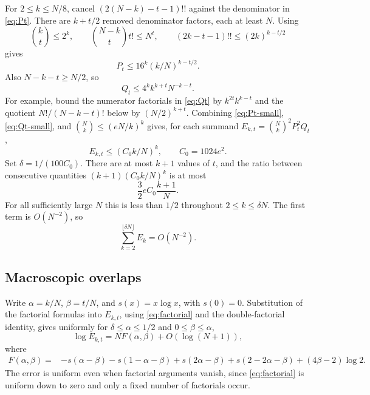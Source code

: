 \documentclass[11pt]{article}
\theoremstyle{remark}
\newcommand{\1}{\mathbf 1}
\begin{document}
For $2\leq k\leq N/8$, cancel
$(2(N-k)-t-1)!!$ against the denominator in \eqref{eq:Pt}.
There are $k+t/2$ removed denominator factors, each at least $N$.
Using
\[
 \binom kt\leq2^k,\qquad
 \binom{N-k}t t!\leq N^t,\qquad
 (2k-t-1)!!\leq(2k)^{k-t/2}
\]
gives
\begin{equation}\label{eq:Pt-small}
 P_t\leq16^k(k/N)^{k-t/2}.
\end{equation}
Also $N-k-t\geq N/2$, so
\begin{equation}\label{eq:Qt-small}
 Q_t\leq4^k k^{k+t}N^{-k-t}.
\end{equation}
For example, bound the numerator factorials in \eqref{eq:Qt} by
$k^{2t}k^{k-t}$ and the quotient $N!/(N-k-t)!$ below by
$(N/2)^{k+t}$. Combining \eqref{eq:Pt-small},
\eqref{eq:Qt-small}, and $\binom Nk\leq(eN/k)^k$ gives, for each
summand $E_{k,t}=\binom Nk^2P_t^2Q_t$,
\[
 E_{k,t}\leq(C_0k/N)^k,\qquad C_0=1024e^2.
\]
Set $\delta=1/(100C_0)$. There are at most $k+1$ values of $t$, and
the ratio between consecutive quantities
$(k+1)(C_0k/N)^k$ is at most
\[
 \frac32 e C_0\frac{k+1}{N}.
\]
For all sufficiently large $N$ this is less than $1/2$ throughout
$2\leq k\leq\delta N$. The first term is $O(N^{-2})$, so
\begin{equation}\label{eq:small-overlaps}
 \sum_{k=2}^{\lfloor\delta N\rfloor}E_k=O(N^{-2}).
\end{equation}

\subsection{Macroscopic overlaps}

Write $\alpha=k/N$, $\beta=t/N$, and $s(x)=x\log x$, with $s(0)=0$.
Substitution of the factorial formulas into $E_{k,t}$, using
\eqref{eq:factorial} and the double-factorial identity, gives uniformly
for $\delta\leq\alpha\leq1/2$ and $0\leq\beta\leq\alpha$,
\begin{equation}\label{eq:F-approx}
 \log E_{k,t}=NF(\alpha,\beta)+O(\log(N+1)),
\end{equation}
where
\begin{align}
 F(\alpha,\beta)
 ={}&-s(\alpha-\beta)-s(1-\alpha-\beta)
      +s(2\alpha-\beta)+s(2-2\alpha-\beta)
      +(4\beta-2)\log2.\label{eq:F}
\end{align}
The error is uniform even when factorial arguments vanish, since
\eqref{eq:factorial} is uniform down to zero and only a fixed number of
factorials occur.
\end{document}
